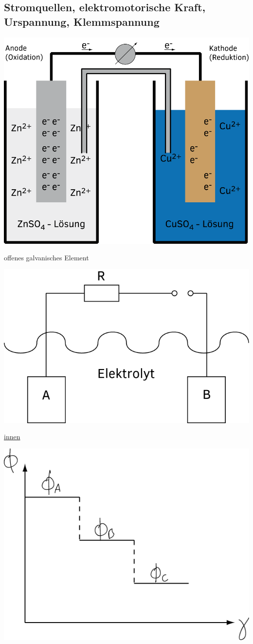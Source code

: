 \subsection{Stromquellen, elektromotorische Kraft, Urspannung, Klemmspannung}

\begin{center}
	\includegraphics[width=0.7\linewidth]{skizzen/15/15_6/15_6B0}
\end{center}

offenes galvanisches Element

\begin{center}
\includegraphics[width=0.4\linewidth]{skizzen/15/15_6/15_6B1}
\end{center}


\underline{innen}

\begin{center}
\includegraphics[width=0.5\linewidth]{skizzen/15/15_6/15_6B2}
\end{center}


